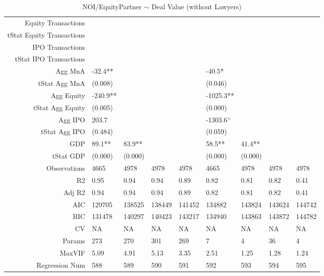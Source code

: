 \begin{table}[ht]
\begin{tabular}{rllllllll}
  Equity Transactions &  &  &  &  &  &  &  &  \\ 
  tStat Equity Transactions &  &  &  &  &  &  &  &  \\ 
  IPO Transactions &  &  &  &  &  &  &  &  \\ 
  tStat IPO Transactions &  &  &  &  &  &  &  &  \\ 
  Agg MnA & -32.4** &  &  &  & -40.5* &  &  &  \\ 
  tStat Agg MnA & (0.008) &  &  &  & (0.046) &  &  &  \\ 
  Agg Equity & -240.9** &  &  &  & -1025.3** &  &  &  \\ 
  tStat Agg Equity & (0.005) &  &  &  & (0.000) &  &  &  \\ 
  Agg IPO & 203.7 &  &  &  & -1303.6$^{+}$ &  &  &  \\ 
  tStat Agg IPO & (0.484) &  &  &  & (0.059) &  &  &  \\ 
  GDP & 89.1** & 83.9** &  &  & 58.5** & 41.4** &  &  \\ 
  tStat GDP & (0.000) & (0.000) &  &  & (0.000) & (0.000) &  &  \\ 
  Observations & 4665 & 4978 & 4978 & 4978 & 4665 & 4978 & 4978 & 4978 \\ 
  R2 & 0.95 & 0.94 & 0.94 & 0.89 & 0.82 & 0.81 & 0.82 & 0.41 \\ 
  Adj R2 & 0.94 & 0.94 & 0.94 & 0.89 & 0.82 & 0.81 & 0.82 & 0.41 \\ 
  AIC & 129705 & 138525 & 138449 & 141452 & 134882 & 143824 & 143624 & 144742 \\ 
  BIC & 131478 & 140297 & 140423 & 143217 & 134940 & 143863 & 143872 & 144782 \\ 
  CV & NA & NA & NA & NA & NA & NA & NA & NA \\ 
  Params & 273 & 270 & 301 & 269 & 7 & 4 & 36 & 4 \\ 
  MaxVIF & 5.09 & 4.91 & 5.13 & 3.35 & 2.51 & 1.25 & 1.28 & 1.24 \\ 
  Regression Num & 588 & 589 & 590 & 591 & 592 & 593 & 594 & 595 \\ 
   \hline
\end{tabular}
\caption{NOI/EquityPartner $\sim$ Deal Value (without Lawyers)} 
\end{table}

